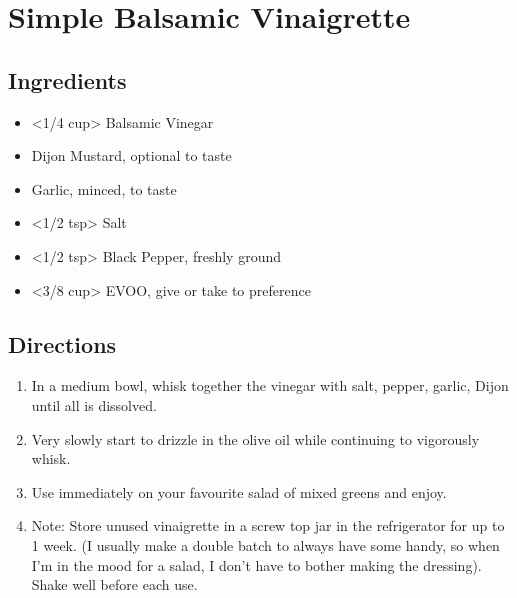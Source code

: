\section{Simple Balsamic Vinaigrette}

\subsection{ Ingredients }

\begin{itemize}
  \item <1/4 cup> Balsamic Vinegar
  \item <1 tsp> Dijon Mustard, optional to taste
  \item <2 clove> Garlic, minced, to taste
  \item <1/2 tsp> Salt
  \item <1/2 tsp> Black Pepper, freshly ground
  \item <3/8 cup> EVOO, give or take to preference
\end{itemize}

\subsection{ Directions }

\begin{enumerate}
  \item In a medium bowl, whisk together the vinegar with salt, pepper, garlic, Dijon until all is dissolved. 
  \item Very slowly start to drizzle in the olive oil while continuing to vigorously whisk.

  \item Use immediately on your favourite salad of mixed greens and enjoy.

  \item Note: Store unused vinaigrette in a screw top jar in the refrigerator for up to 1 week. (I usually make a double batch to always have some handy, so when I'm in the mood for a salad, I don't have to bother making the dressing). Shake well before each use.
\end{enumerate}

